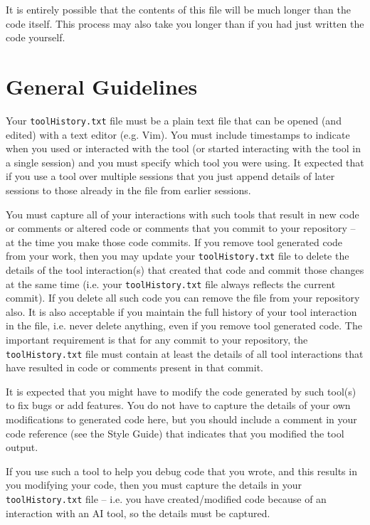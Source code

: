 \documentclass{article}
\begin{document}
It is entirely possible that the contents of this file will be much longer than the code itself. This process may also take you longer
than if you had just written the code yourself.

\section {General Guidelines}
Your \texttt{toolHistory.txt} file must be a plain text file that can be opened (and edited) with a text editor (e.g. Vim). You must include
timestamps to indicate when you used or interacted with the tool (or started interacting with the tool in a single session) and you must
specify which tool you were using. It expected that if you use a tool over multiple sessions that you just append details of later sessions
to those already in the file from earlier sessions.

You must capture all of your interactions with such tools that result in new code or comments or altered code or comments that you commit to your repository --
at the time you make those code commits. If you 
remove tool generated code from your work, then you may update your \texttt{toolHistory.txt} file to delete the details of the
tool interaction(s) that created that code and commit those changes at the same time (i.e. your \texttt{toolHistory.txt} file
always reflects the current commit). If you delete all such code you can remove the file from your repository also.
It is also acceptable if you maintain the full history of your tool interaction in the file, i.e. never delete anything, even if you 
remove tool generated code. The important requirement is that for any commit to your repository, the \texttt{toolHistory.txt} file
must contain at least the details of all tool interactions that have resulted in code or comments present in that commit.

It is expected that you might have to modify the code generated by such tool(s) to fix bugs or add features. 
You do not have to capture the details
of your own modifications to generated code here, but you should include a comment in your code reference (see the Style Guide)
that indicates that you modified the tool output. 

If you use such a tool to help you debug code that you wrote, and this results in you modifying your code, then 
you must capture the details in your \texttt{toolHistory.txt} file -- i.e. you have created/modified code because of an 
interaction with an AI tool, so the details must be captured.
\end{document}
